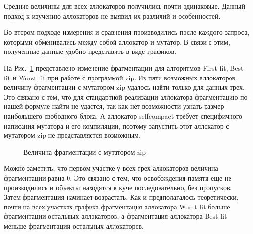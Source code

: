 Средние величины для всех аллокаторов получились почти одинаковые. Данный подход к изучению аллокаторов не выявил их различий и особенностей.
   
Во втором подходе измерения и сравнения производились после каждого запроса, которыми обменивались между собой аллокатор и мутатор. В связи с этим,
 полученные данные удобно представить в виде графиков.
   
На Рис.~\ref{ris:image} представлено изменение фрагментации для алгоритмов First fit, Best fit и Worst fit при работе с программой zip. 
Из пяти возможных аллокаторов величину фрагментации с мутатором zip удалось найти только для данных трех. Это связано с тем, что для стандартной 
реализации аллокатора фрагментацию по нашей формуле найти не удастся, так как нет возможности узнать размер наибольшего свободного блока. 
А аллокатор selfcompact требует специфичного написания мутатора и его компиляции, поэтому запустить этот аллокатор с 
мутатором zip не представляется возможным.
   
   \begin{figure}[h]
   \caption{Величина фрагментации с мутатором zip}
   \label{ris:image}
   \end{figure}
   
   Можно заметить, что первом участке у всех трех аллокаторов величина фрагментации равна 0. Это связано с тем, что освобождения памяти еще не 
производились и объекты находятся в куче последовательно, без пропусков. Затем фрагментация начинает возрастать. Как и 
предполагалось теоретически, почти на всех участках графика фрагментация аллокатора Worst fit больше фрагментации остальных 
аллокаторов, а фрагментация аллокатора Best fit меньше фрагментации остальных аллокаторов.
   
